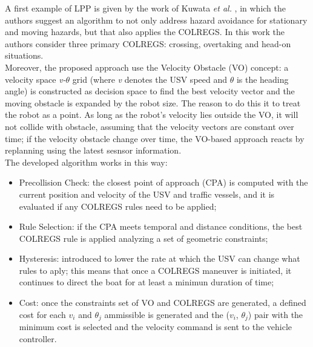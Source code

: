 \documentclass[journal]{IEEEtran}
\begin{document}
              A first example of LPP is given by the work of Kuwata \textit{et al.} \cite{Kuwata2014}, in which the authors suggest an algorithm to not only address hazard avoidance for stationary and moving hazards, but that also applies the COLREGS. In this work the authors consider three primary COLREGS: crossing, overtaking and head-on situations.\\
              Moreover, the proposed approach use the Velocity Obstacle (VO) concept: a velocity space \textit{v-$\theta$} grid (where \textit{v} denotes the USV speed and \textit{$\theta$} is the heading angle) is constructed as decision space to find the best velocity vector and the moving obstacle is expanded by the robot size. The reason to do this it to treat the robot as a point. As long as the robot's velocity lies outside the VO, it will not collide with obstacle, assuming that the velocity vectors are constant over time; if the velocity obstacle change over time, the VO-based approach reacts by replanning using the latest sesnsor information.\\
              The developed algorithm works in this way:
                    \begin{itemize}
                          \item Precollision Check: the closest point of approach (CPA) is computed with the current position and velocity of the USV and traffic vessels, and it is evaluated if any COLREGS rules need to be applied;
                          \item Rule Selection: if the CPA meets temporal and distance conditions, the best COLREGS rule is applied analyzing a set of geometric constraints;
                          \item Hysteresis: introduced to lower the rate at which the USV can change what rules to aply; this means that once a COLREGS maneuver is initiated, it continues to direct the boat for at least a minimun duration of time;
                          \item Cost: once the constraints set of VO and COLREGS are generated, a defined cost for each \textit{$v_i$} and \textit{$\theta_j$} ammissible is generated and the (\textit{$v_i$}, \textit{$\theta_j$}) pair with the minimum cost is selected and the velocity command is sent to the vehicle controller.
                    \end{itemize}
\end{document}

